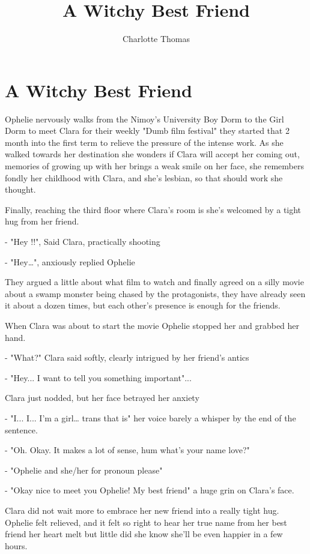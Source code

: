 \documentclass[hidelinks,12pt]{book}
\title{A Witchy Best Friend}
\author{Charlotte Thomas}
\begin{document}
\chapter{A Witchy Best Friend}

Ophelie nervously walks from the Nimoy's University Boy Dorm to the Girl Dorm to meet Clara for their weekly 
"Dumb film festival" they started that 2 month into the first term to relieve the pressure of the intense work.
As she walked towards her destination she wonders if Clara will accept her coming out, memories of growing up with 
her brings a weak smile on her face, she remembers fondly her childhood with Clara, and she's lesbian, so that 
should work she thought.\par 
\bigskip 

Finally, reaching the third floor where Clara's room is she's welcomed by a tight hug from her friend.\par
- "Hey !!", Said Clara, practically shooting\par
- "Hey…", anxiously replied Ophelie\par
\bigskip

They argued a little about what film to watch and finally agreed on a silly movie about a swamp monster being 
chased by the protagonists, they have already seen it about a dozen times, but each other's presence is enough 
for the friends.\par 
\bigskip

When Clara was about to start the movie Ophelie stopped her and grabbed her hand.\par
- "What?" Clara said softly, clearly intrigued by her friend's antics\par
- "Hey... I want to tell you something important"...\par
\bigskip

Clara just nodded, but her face betrayed her anxiety\par
- "I... I... I'm a girl… trans that is" her voice barely a whisper by the end of the sentence.\par
- "Oh. Okay. It makes a lot of sense, hum what's your name love?"\par
- "Ophelie and she/her for pronoun please" \par 
- "Okay nice to meet you Ophelie! My best friend" a huge grin on Clara's face.\par
\bigskip

Clara did not wait more to embrace her new friend into a really tight hug. Ophelie felt relieved, 
and it felt so right to hear her true name from her best friend her heart melt but little did she know she'll 
be even happier in a few hours.
\end{document}
